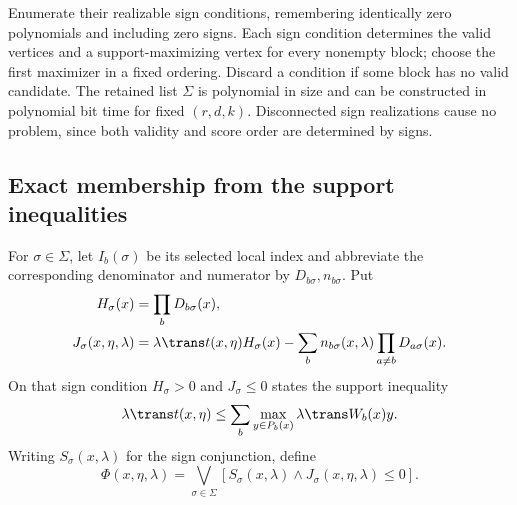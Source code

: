Enumerate their realizable sign conditions, remembering identically zero
polynomials and including zero signs. Each sign condition determines the
valid vertices and a support-maximizing vertex for every nonempty block;
choose the first maximizer in a fixed ordering. Discard a condition if
some block has no valid candidate. The retained list $\Sigma$ is
polynomial in size and can be constructed in polynomial bit time for
fixed $(r,d,k)$. Disconnected sign realizations cause no problem, since
both validity and score order are determined by signs.

\subsection{Exact membership from the support inequalities}\label{app:support-membership}

For $\sigma\in\Sigma$, let $I_b(\sigma)$ be its selected local
index and abbreviate the corresponding denominator and numerator by
$D_{b\sigma},n_{b\sigma}$. Put
\begin{equation}\label{eq:core-cleared-support}
 \begin{split}
 H_\sigma(x)&=\prod_bD_{b\sigma}(x),\\
 J_\sigma(x,\eta,\lambda)&=
 \lambda\trans t(x,\eta)H_\sigma(x)
             -\sum_b n_{b\sigma}(x,\lambda)\prod_{a\ne b}D_{a\sigma}(x).
 \end{split}
\end{equation}
On that sign condition $H_\sigma>0$ and $J_\sigma\le0$ states the
support inequality
\[
 \lambda\trans t(x,\eta)\le
                     \sum_b\max_{y\in P_b(x)}\lambda\trans W_b(x)y.
\]
Writing $S_\sigma(x,\lambda)$ for the sign conjunction, define
\begin{equation}\label{eq:core-support-predicate}
 \Phi(x,\eta,\lambda)=\bigvee_{\sigma\in\Sigma}
                  [S_\sigma(x,\lambda)\wedge J_\sigma(x,\eta,\lambda)\le0].
\end{equation}

